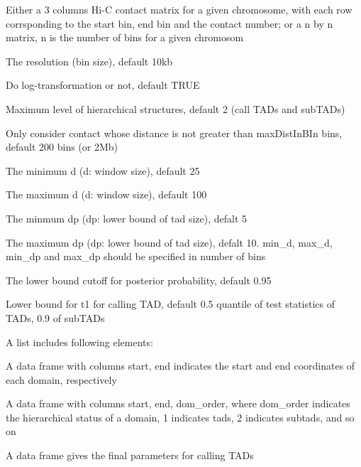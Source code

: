 \documentclass[a4paper]{book}
\begin{document}
\begin{Arguments}
\begin{ldescription}
\item[\code{hic\_mat}] Either a 3 columns Hi-C contact matrix for a given chromosome, with each row corrsponding to the start bin,
end bin and the contact number; or a n by n matrix, n is the number of bins for a given chromosom

\item[\code{resl}] The resolution (bin size), default 10kb

\item[\code{logt}] Do log-transformation or not, default TRUE

\item[\code{dom\_order}] Maximum level of hierarchical structures, default 2 (call TADs and subTADs)

\item[\code{maxDistInBin}] Only consider contact whose distance is not greater than maxDistInBIn bins,
default 200 bins (or 2Mb)

\item[\code{min\_d}] The minimum d (d: window size), default 25

\item[\code{max\_d}] The maximum d (d: window size), default 100

\item[\code{min\_dp}] The minmum dp (dp: lower bound of tad size), defalt 5

\item[\code{max\_dp}] The maximum dp (dp: lower bound of tad size), defalt 10.
min\_d, max\_d, min\_dp and max\_dp should be specified in number of bins

\item[\code{hthr}] The lower bound cutoff for posterior probability, default 0.95

\item[\code{t1thr}] Lower bound for t1 for calling TAD, default 0.5 quantile of test statistics
of TADs, 0.9 of subTADs
\end{ldescription}
\end{Arguments}
%
\begin{Value}
A list includes following elements:
\begin{ldescription}
\item[\code{tads}] A data frame with columns start, end indicates the start and end coordinates of each domain, respectively
\item[\code{hierTads}] A data frame with columns start, end, dom\_order, where dom\_order indicates the hierarchical status of a domain, 1 indicates tads, 2 indicates subtads, and so on
\item[\code{params}] A data frame gives the final parameters for calling TADs
\end{ldescription}
\end{Value}
\end{document}
